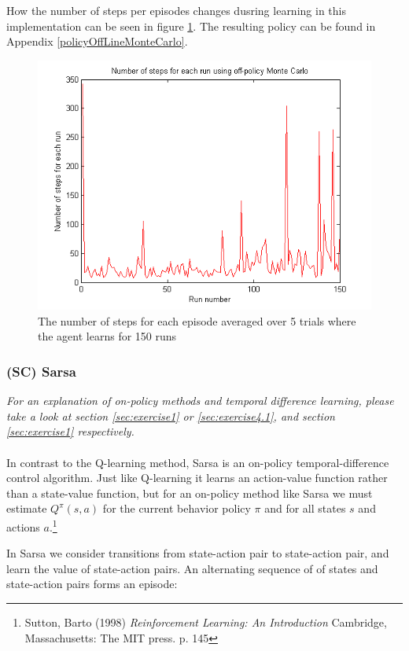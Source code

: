 \documentclass{article}
\begin{document}
How the number of steps per episodes changes dusring learning in this implementation can be seen in figure \ref{offLine}. The resulting policy can be found in Appendix \ref{policyOffLineMonteCarlo}.

\begin{figure}
\centering
\label{offLine}
\caption{The number of steps for each episode averaged over 5 trials where the agent learns for 150 runs}
\includegraphics[scale=0.8]{offpolicy.png}
\end{figure}



\subsubsection{(SC) Sarsa}\label{sec:exercise4.3}
\textit{For an explanation of on-policy methods and temporal difference learning, please take a look at section \ref{sec:exercise1} or \ref{sec:exercise4.1}, and section \ref{sec:exercise1} respectively.}
\\ \\
In contrast to the Q-learning method, Sarsa is an on-policy temporal-difference control algorithm. Just like Q-learning it learns an action-value function rather than a state-value function, but for an on-policy method like Sarsa we must estimate $Q^\pi (s,a)$ for the current behavior policy $\pi$ and for all states $s$ and actions $a$.\footnote{Sutton, Barto (1998) \textit{Reinforcement Learning: An Introduction} Cambridge, Massachusetts: The MIT press. p. 145}

In Sarsa we consider transitions from state-action pair to state-action pair, and learn the value of state-action pairs. An alternating sequence of of states and state-action pairs forms an episode:
\end{document}
